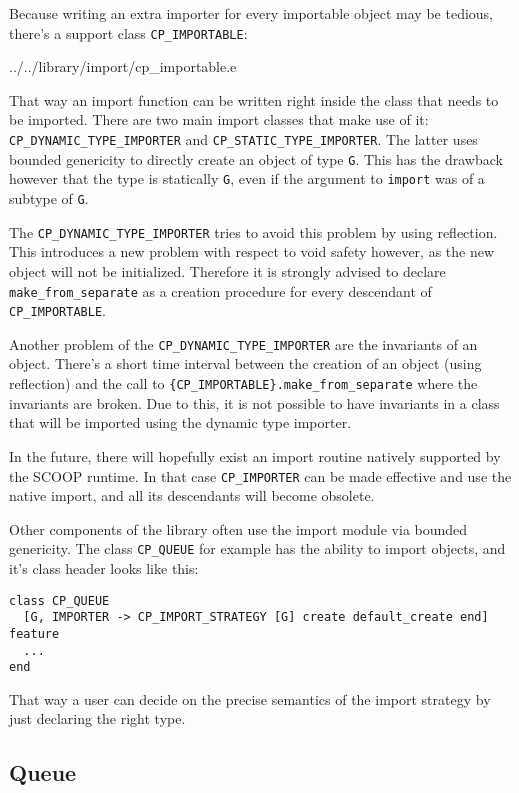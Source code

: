 \documentclass[a4paper,10pt]{report}
\begin{document}
Because writing an extra importer for every importable object may be tedious, there's a support class \lstinline!CP_IMPORTABLE!:

 {../../library/import/cp_importable.e}

That way an import function can be written right inside the class that needs to be imported.
There are two main import classes that make use of it: \lstinline!CP_DYNAMIC_TYPE_IMPORTER! and \lstinline!CP_STATIC_TYPE_IMPORTER!.
The latter uses bounded genericity to directly create an object of type \lstinline!G!.
This has the drawback however that the type is statically \lstinline!G!, even if the argument to \lstinline!import! was of a subtype of \lstinline!G!.

The \lstinline!CP_DYNAMIC_TYPE_IMPORTER! tries to avoid this problem by using reflection.
This introduces a new problem with respect to void safety however, as the new object will not be initialized.
Therefore it is strongly advised to declare \lstinline!make_from_separate! as a creation procedure for every descendant of \lstinline!CP_IMPORTABLE!.

Another problem of the \lstinline!CP_DYNAMIC_TYPE_IMPORTER! are the invariants of an object.
There's a short time interval between the creation of an object (using reflection) and the call to \lstinline!{CP_IMPORTABLE}.make_from_separate! where the invariants are broken.
Due to this, it is not possible to have invariants in a class that will be imported using the dynamic type importer.

In the future, there will hopefully exist an import routine natively supported by the SCOOP runtime.
In that case \lstinline!CP_IMPORTER! can be made effective and use the native import, and all its descendants will become obsolete.


Other components of the library often use the import module via bounded genericity.
The class \lstinline!CP_QUEUE! for example has the ability to import objects, and it's class header looks like this:
\begin{lstlisting}
class CP_QUEUE
  [G, IMPORTER -> CP_IMPORT_STRATEGY [G] create default_create end]
feature
  ...
end
\end{lstlisting}
That way a user can decide on the precise semantics of the import strategy by just declaring the right type.
 
\subsection{Queue}
\end{document}
